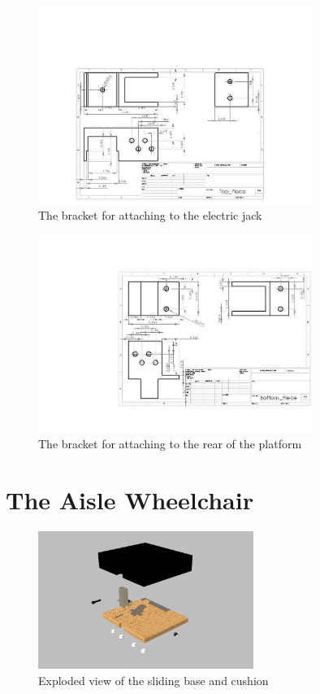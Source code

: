 \begin{figure}
\centering
 \includegraphics[width=0.8\textwidth]{images/Top_Piece}
\caption{The bracket for attaching to the electric jack}
\label{fig:top_piece}
\end{figure}

\begin{figure}
\centering
 \includegraphics[width=0.8\textwidth]{images/Bottom_Piece}
\caption{The bracket for attaching to the rear of the platform}
\label{fig:bottom_piece}
\end{figure}

\newpage

\section{The Aisle Wheelchair}

\begin{figure}[h]
\centering
\includegraphics[width=7cm]{images/vistaex1.png}
\caption{Exploded view of the sliding base and cushion}
\label{fig:vistaex1}
\end{figure}

